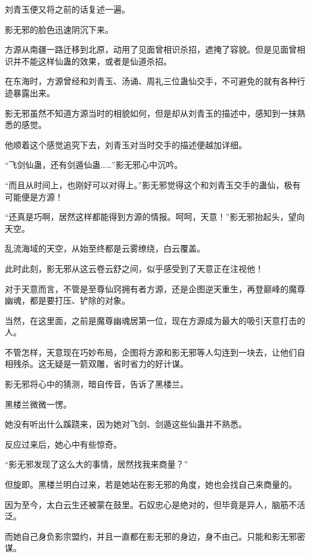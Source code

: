 
\begin{this_body}

刘青玉便又将之前的话复述一遍。

影无邪的脸色迅速阴沉下来。

方源从南疆一路迁移到北原，动用了见面曾相识杀招，遮掩了容貌。但是见面曾相识并不能这样仙蛊的效果，或者是仙道杀招。

在东海时，方源曾经和刘青玉、汤诵、周礼三位蛊仙交手，不可避免的就有各种行迹暴露出来。

影无邪虽然不知道方源当时的相貌如何，但是却从刘青玉的描述中，感知到一抹熟悉的感觉。

他顺着这个感觉追究下去，刘青玉对当时交手的描述便越加详细。

“飞剑仙蛊，还有剑遁仙蛊……”影无邪心中沉吟。

“而且从时间上，也刚好可以对得上。”影无邪觉得这个和刘青玉交手的蛊仙，极有可能便是方源！

“还真是巧啊，居然这样都能得到方源的情报。呵呵，天意！”影无邪抬起头，望向天空。

乱流海域的天空，从始至终都是云雾缭绕，白云覆盖。

此时此刻，影无邪从这云卷云舒之间，似乎感受到了天意正在注视他！

对于天意而言，不管是至尊仙窍拥有者方源，还是企图逆天重生，再登巅峰的魔尊幽魂，都是要打压、铲除的对象。

当然，在这里面，之前是魔尊幽魂居第一位，现在方源成为最大的吸引天意打击的人。

不管怎样，天意现在巧妙布局，企图将方源和影无邪等人勾连到一块去，让他们自相残杀。这无疑是一箭双雕，省时省力的好计谋。

影无邪将心中的猜测，暗自传音，告诉了黑楼兰。

黑楼兰微微一愣。

她没有听出什么蹊跷来，因为她对飞剑、剑遁这些仙蛊并不熟悉。

反应过来后，她心中有些惊奇。

“影无邪发现了这么大的事情，居然找我来商量？”

但旋即。黑楼兰明白过来，若是她站在影无邪的角度，她也会找自己来商量的。

因为至今，太白云生还被蒙在鼓里。石奴忠心是绝对的，但毕竟是异人，脑筋不活泛。

而她自己身负影宗盟约，并且一直都在影无邪的身边，身不由己。只能和影无邪密谋。


\end{this_body}
